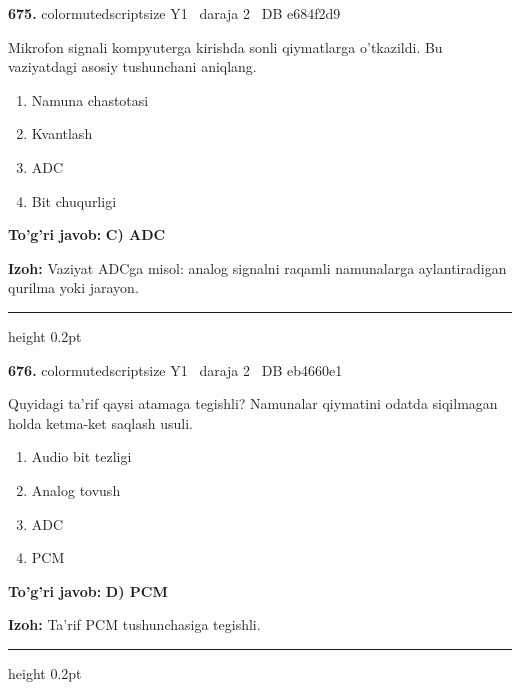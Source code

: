 \documentclass[10pt,a4paper,oneside]{article}
\begin{document}
\noindent\textbf{\color{ink}675.}  {color{muted}scriptsize Y1 \textbullet\ daraja 2 \textbullet\ DB e684f2d9}
\par
Mikrofon signali kompyuterga kirishda sonli qiymatlarga o'tkazildi. Bu vaziyatdagi asosiy tushunchani aniqlang.
\begin{enumerate}[label=\Alph*),leftmargin=9mm]
\item Namuna chastotasi
\item Kvantlash
\item ADC
\item Bit chuqurligi
\end{enumerate}
\begin{tcolorbox}[enhanced,breakable,colback=teal!4,colframe=teal!50!black,boxrule=0.5pt,arc=1.1mm,left=3mm,right=3mm,top=1.7mm,bottom=1.7mm,before skip=2mm,after skip=2mm]
\textbf{\color{teal}To'g'ri javob:} \textbf{C) ADC}
\par\smallskip
\textbf{Izoh:} Vaziyat ADCga misol: analog signalni raqamli namunalarga aylantiradigan qurilma yoki jarayon.
\end{tcolorbox}
\vspace{2mm}\hrule height 0.2pt \vspace{3mm}

\noindent\textbf{\color{ink}676.}  {color{muted}scriptsize Y1 \textbullet\ daraja 2 \textbullet\ DB eb4660e1}
\par
Quyidagi ta'rif qaysi atamaga tegishli? Namunalar qiymatini odatda siqilmagan holda ketma-ket saqlash usuli.
\begin{enumerate}[label=\Alph*),leftmargin=9mm]
\item Audio bit tezligi
\item Analog tovush
\item ADC
\item PCM
\end{enumerate}
\begin{tcolorbox}[enhanced,breakable,colback=teal!4,colframe=teal!50!black,boxrule=0.5pt,arc=1.1mm,left=3mm,right=3mm,top=1.7mm,bottom=1.7mm,before skip=2mm,after skip=2mm]
\textbf{\color{teal}To'g'ri javob:} \textbf{D) PCM}
\par\smallskip
\textbf{Izoh:} Ta'rif PCM tushunchasiga tegishli.
\end{tcolorbox}
\vspace{2mm}\hrule height 0.2pt \vspace{3mm}
\end{document}
